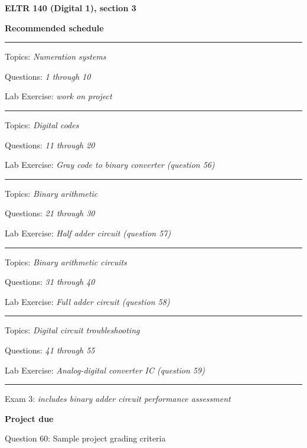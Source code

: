 
\centerline{\bf ELTR 140 (Digital 1), section 3} \bigskip 
 
\vskip 10pt

\noindent
{\bf Recommended schedule}

\vskip 5pt

\hrule \vskip 5pt
\noindent
{}

\hskip 10pt Topics: {\it Numeration systems}
 
\hskip 10pt Questions: {\it 1 through 10}
 
\hskip 10pt Lab Exercise: {\it work on project}
 
\vskip 10pt
\hrule \vskip 5pt
\noindent
{}

\hskip 10pt Topics: {\it Digital codes}
 
\hskip 10pt Questions: {\it 11 through 20}
 
\hskip 10pt Lab Exercise: {\it Gray code to binary converter (question 56)}
 
\vskip 10pt
\hrule \vskip 5pt
\noindent
{}

\hskip 10pt Topics: {\it Binary arithmetic}
 
\hskip 10pt Questions: {\it 21 through 30}
 
\hskip 10pt Lab Exercise: {\it Half adder circuit (question 57)}
 
\vskip 10pt
\hrule \vskip 5pt
\noindent
{}

\hskip 10pt Topics: {\it Binary arithmetic circuits}
 
\hskip 10pt Questions: {\it 31 through 40}
 
\hskip 10pt Lab Exercise: {\it Full adder circuit (question 58)}
 
\vskip 10pt
\hrule \vskip 5pt
\noindent
{}

\hskip 10pt Topics: {\it Digital circuit troubleshooting}
 
\hskip 10pt Questions: {\it 41 through 55}
 
\hskip 10pt Lab Exercise: {\it Analog-digital converter IC (question 59)}
 
\vskip 10pt
\hrule \vskip 5pt
\noindent
{}

\hskip 10pt Exam 3: {\it includes binary adder circuit performance assessment}
 
\hskip 10pt {\bf Project due}

\hskip 10pt Question 60: Sample project grading criteria
 
